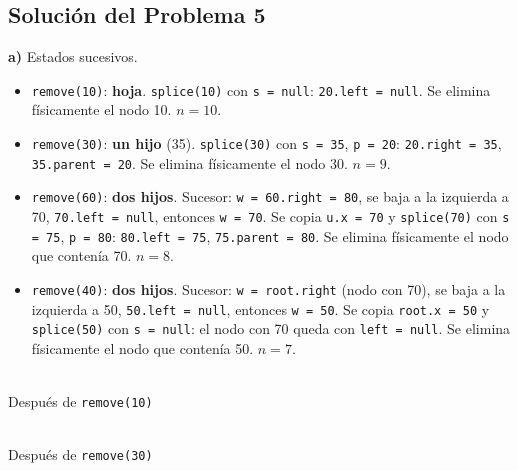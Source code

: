 \documentclass[11pt,a4paper]{article}
\begin{document}
\newpage
\subsection*{Solución del Problema 5}

\textbf{a)} Estados sucesivos.

\begin{itemize}[itemsep=1pt]
\item \texttt{remove(10)}: \textbf{hoja}. \texttt{splice(10)} con \texttt{s = null}: \texttt{20.left = null}. Se elimina físicamente el nodo 10. $n = 10$.
\item \texttt{remove(30)}: \textbf{un hijo} (35). \texttt{splice(30)} con \texttt{s = 35}, \texttt{p = 20}: \texttt{20.right = 35}, \texttt{35.parent = 20}. Se elimina físicamente el nodo 30. $n = 9$.
\item \texttt{remove(60)}: \textbf{dos hijos}. Sucesor: \texttt{w = 60.right = 80}, se baja a la izquierda a 70, \texttt{70.left = null}, entonces \texttt{w = 70}. Se copia \texttt{u.x = 70} y \texttt{splice(70)} con \texttt{s = 75}, \texttt{p = 80}: \texttt{80.left = 75}, \texttt{75.parent = 80}. Se elimina físicamente el nodo que contenía 70. $n = 8$.
\item \texttt{remove(40)}: \textbf{dos hijos}. Sucesor: \texttt{w = root.right} (nodo con 70), se baja a la izquierda a 50, \texttt{50.left = null}, entonces \texttt{w = 50}. Se copia \texttt{root.x = 50} y \texttt{splice(50)} con \texttt{s = null}: el nodo con 70 queda con \texttt{left = null}. Se elimina físicamente el nodo que contenía 50. $n = 7$.
\end{itemize}

\begin{center}
\begin{minipage}{0.48\textwidth}
\centering
{}\\
{\small Después de \texttt{remove(10)}}
\end{minipage}
\hfill
\begin{minipage}{0.48\textwidth}
\centering
{}\\
{\small Después de \texttt{remove(30)}}
\end{minipage}
\end{center}
\end{document}
